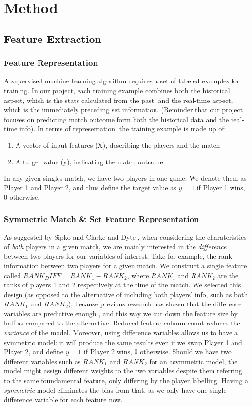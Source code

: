 \documentclass[paper=a4, fontsize=11pt]{scrartcl} %
\numberwithin{equation}{section} %
\numberwithin{figure}{section} %
\numberwithin{table}{section} %
\begin{document}
\section{Method}
\subsection{Feature Extraction}
\subsubsection{Feature Representation}
A supervised machine learning algorithm requires a set of labeled examples for training. In our project, each training example combines both the historical aspect, which is the stats calculated from the past, and the real-time aspect, which is the immediately preceding set information. (Reminder that our project focuses on predicting match outcome form both the historical data and the real-time info). In terms of representation, the training example is made up of:
\begin{enumerate}
\item A vector of input features (X), describing the players and the match
\item A target value (y), indicating the match outcome
\end{enumerate}
In any given singles match, we have two players in one game. We denote them as Player 1 and Player 2, and thus define the target value as 
$y = 1$ if Player 1 wins, 0 otherwise.
\subsubsection{Symmetric Match \& Set Feature Representation}
As suggested by Sipko \cite{tennis1} and Clarke and Dyte \cite{Clarke2010}, when considering the charateristics of \textit{both} players in a given match, we are mainly interested in the \textit{difference} between two players for our variables of interest. Take for example, the rank information between two players for a given match. We construct a single feature called $RANK_DIFF = RANK_1 - RANK_2$, where $RANK_1$ and $RANK_2$ are the ranks of players 1 and 2 respectively at the time of the match. We selected this design (as opposed to the alternative of including both players' info, such as both $RANK_1$ and $RANK_2$), because previous research has shown that the difference variables are predictive enough \cite{tennis1} \cite{omalley}, and this way we cut down the feature size by half as compared to the alternative. Reduced feature column count reduces the \textit{variance} of the model. Moreover, using difference variables allows us to have a symmetric model: it will produce the same results even if we swap Player 1 and Player 2, and define $y = 1$ if Player 2 wins, 0 otherwise. Should we have two different variables such as $RANK_1$ and $RANK_2$ for an asymmetric model, the model might assign different weights to the two variables despite them referring to the same foundamental feature, only differing by the player labelling. Having a \textit{symmetric} model eliminates the bias from that, as we only have one single difference variable for each feature now. 
\end{document}
